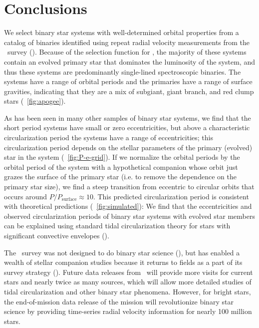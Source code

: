 \documentclass[modern, letterpaper]{aastex62}
\newcommand{\apogee}{\project{\acronym{APOGEE}}}
\newcommand{\Psurf}{\ensuremath{P_\textrm{surface}}}
\begin{document}
\section{Conclusions}

We select binary star systems with well-determined orbital properties from a
catalog of binaries identified using repeat radial velocity measurements from
the \apogee\ survey (\citealt{Price-Whelan:2018}).
Because of the selection function for \apogee, the majority of these systems
contain an evolved primary star that dominates the luminosity of the system, and
thus these systems are predominantly single-lined spectroscopic binaries.
The systems have a range of orbital periods and the primaries have a range of
surface gravities, indicating that they are a mix of subgiant, giant branch, and
red clump stars (\figurename~\ref{fig:apogee}).

As has been seen in many other samples of binary star systems, we find that the
short period systems have small or zero eccentricities, but above a
characteristic circularization period the systems have a range of
eccentricities; this circularization period depends on the stellar parameters of
the primary (evolved) star in the system (\figurename~\ref{fig:P-e-grid}).
If we normalize the orbital periods by the orbital period of the system with a
hypothetical companion whose orbit just grazes the surface of the primary star
(i.e. to remove the dependence on the primary star size), we find a steep
transition from eccentric to circular orbits that occurs around $P / \Psurf
\approx 10$.
This predicted circularization period is consistent with theoretical predictions
(\figurename~\ref{fig:simulated}):
We find that the eccentricities and observed circularization periods of binary
star systems with evolved star members can be explained using standard tidal
circularization theory for stars with significant convective envelopes
(\citealt{Zahn:1977, Zahn:1989, Verbunt:1995}).

The \apogee\ survey was not designed to do binary star science
(\citealt{Majewski:2017}), but has enabled a wealth of stellar companion studies
because it returns to fields as a part of its survey strategy
(\citealt{Troup:2016, Badenes:2018, Price-Whelan:2018}).
Future data releases from \apogee\ will provide more visits for current stars
and nearly twice as many sources, which will allow more detailed studies of
tidal circularization and other binary star phenomena.
However, for bright stars, the end-of-mission data release of the 
mission will revolutionize binary star science by providing time-series radial
velocity information for nearly 100 million stars.
\end{document}
